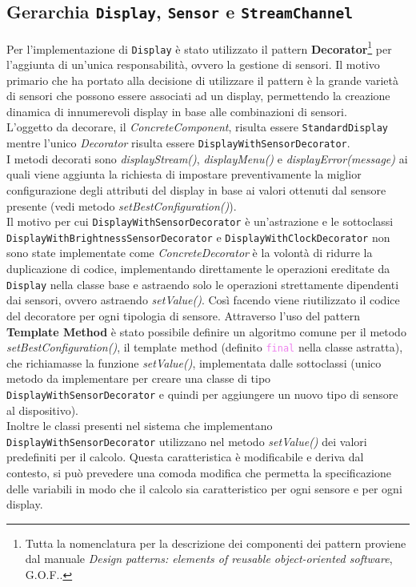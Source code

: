 \documentclass[a4paper,11pt]{article}
\begin{document}
	\subsection{Gerarchia \texttt{Display}, \texttt{Sensor} e \texttt{StreamChannel}}
	Per l'implementazione di \texttt{Display} è stato utilizzato il pattern \textbf{Decorator}\footnote{Tutta la nomenclatura per la descrizione dei componenti dei pattern proviene dal manuale \textit{Design patterns: elements of reusable object-oriented software}, {\selectfont G.O.F.}.} per l'aggiunta di un'unica responsabilità, ovvero la gestione di sensori. Il motivo primario che ha portato alla decisione di utilizzare il pattern è la grande varietà di sensori che possono essere associati ad un display, permettendo la creazione dinamica di innumerevoli display in base alle combinazioni di sensori.\\
	L'oggetto da decorare, il \textit{ConcreteComponent}, risulta essere \texttt{StandardDisplay} mentre l'unico \textit{Decorator} risulta essere \texttt{DisplayWithSensorDecorator}.\\
	I metodi decorati sono \textit{displayStream()}, \textit{displayMenu()} e \textit{displayError(message)} ai quali viene aggiunta la richiesta di impostare preventivamente la miglior configurazione degli attributi del display in base ai valori ottenuti dal sensore presente (vedi metodo \textit{setBestConfiguration()}).\\
	Il motivo per cui \texttt{DisplayWithSensorDecorator} è un'astrazione e le sottoclassi \texttt{DisplayWithBrightnessSensorDecorator} e \texttt{DisplayWithClockDecorator} non sono state implementate come \textit{ConcreteDecorator} è la volontà di ridurre la duplicazione di codice, implementando direttamente le operazioni ereditate da \texttt{Display} nella classe base e astraendo solo le operazioni strettamente dipendenti dai sensori, ovvero astraendo \textit{setValue()}. Così facendo viene riutilizzato il codice del decoratore per ogni tipologia di sensore. Attraverso l'uso del pattern \textbf{Template Method} è stato possibile definire un algoritmo comune per il metodo \textit{setBestConfiguration()}, il template method (definito \textcolor{violet}{\texttt{final}} nella classe astratta), che richiamasse la funzione \textit{setValue()}, implementata dalle sottoclassi (unico metodo da implementare per creare una classe di tipo \texttt{DisplayWithSensorDecorator} e quindi per aggiungere un nuovo tipo di sensore al dispositivo).\\
	Inoltre le classi presenti nel sistema che implementano \texttt{DisplayWithSensorDecorator} utilizzano nel metodo \textit{setValue()} dei valori predefiniti per il calcolo. Questa caratteristica è modificabile e deriva dal contesto, si può prevedere una comoda modifica che permetta la specificazione delle variabili in modo che il calcolo sia caratteristico per ogni sensore e per ogni display.\\
\end{document}
